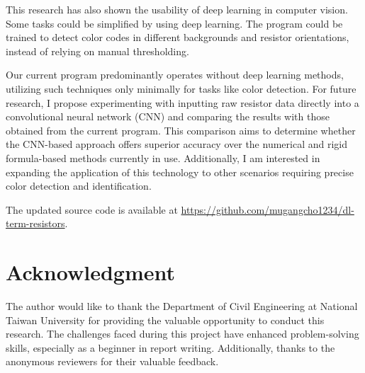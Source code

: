 \documentclass[preprint,12pt,3p,times]{elsarticle}
\begin{document}
This research has also shown the usability of deep learning in computer vision. Some tasks could be simplified by using deep learning. The program could be trained to detect color codes in different backgrounds and resistor orientations, instead of relying on manual thresholding.

Our current program predominantly operates without deep learning methods, utilizing such techniques only minimally for tasks like color detection. For future research, I propose experimenting with inputting raw resistor data directly into a convolutional neural network (CNN) and comparing the results with those obtained from the current program. This comparison aims to determine whether the CNN-based approach offers superior accuracy over the numerical and rigid formula-based methods currently in use. Additionally, I am interested in expanding the application of this technology to other scenarios requiring precise color detection and identification.

The updated source code is available at \url{https://github.com/mugangcho1234/dl-term-resistors}.

\section{Acknowledgment}\label{s6}
The author would like to thank the Department of Civil Engineering at National Taiwan University for providing the valuable opportunity to conduct this research. The challenges faced during this project have enhanced problem-solving skills, especially as a beginner in report writing. Additionally, thanks to the anonymous reviewers for their valuable feedback.




\end{document}

